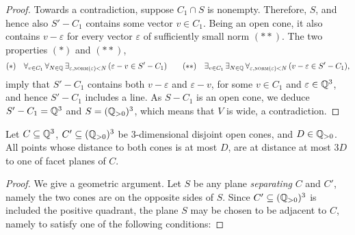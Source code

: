\begin{appendixproof}
\begin{proof}
Towards a contradiction, suppose $C_1 \cap S$ is nonempty.
Therefore, $S$, and hence also $S'-C_1$ contains some vector $v\in C_1$.
Being an open cone, it also contains $v - \varepsilon$ for every vector $\varepsilon$ of sufficiently small norm
$(**)$.
The two properties $(*)$ and $(**)$,
\[
(*) \ \ \ \forall_{v\in C_1} \, \forall_{N\in\mathbb{Q}} \, \exists_{\varepsilon, \textsc{norm}(\varepsilon)<N} \, (\varepsilon - v \in S'-C_1)
\qquad
(**) \ \ \ \exists_{v\in C_1} \, \exists_{N\in\mathbb{Q}} \, \forall_{\varepsilon, \textsc{norm}(\varepsilon)<N} \, (v- \varepsilon  \in S'-C_1),
\]
imply that $S'-C_1$ contains both $v-\varepsilon$ and $\varepsilon-v$, for some
$v\in C_1$ and $\varepsilon\in\mathbb{Q}^3$,
and hence $S'-C_1$
includes a line.
As $S-C_1$ is an open cone, we deduce $S'-C_1=\mathbb{Q}^3$ and  $S=(\mathbb{Q}_{>0})^3$, which means that 
$V$ is wide, a contradiction.
%
%
\end{proof}
%
%
\begin{claim} \label{claim:onefacet}
Let $C\subseteq \mathbb{Q}^3$, $C'\subseteq (\mathbb{Q}_{>0})^3$ be 3-dimensional disjoint open cones, and $D\in\mathbb{Q}_{>0}$. 
All points whose distance to both cones is at most $D$,
are at distance at most $3D$ to one of facet planes of $C$.
\end{claim}
%
\begin{proof}%
We give a geometric argument.
Let $S$ be any plane \emph{separating} $C$ and $C'$, namely the two cones are on the opposite sides of $S$.
Since $C'\subseteq(\mathbb{Q}_{>0})^3$ is included the positive quadrant,
the plane $S$ may be chosen to be adjacent to $C$, namely to satisfy one of the following conditions:


\end{proof}
\end{appendixproof}
